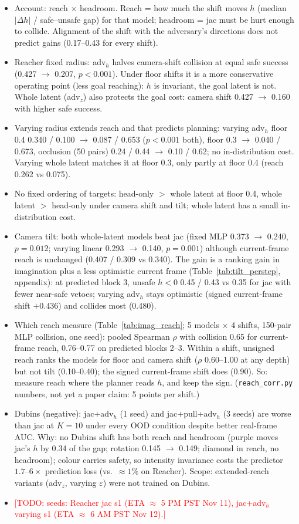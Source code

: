 \documentclass{article}
\newcommand{\todo}[1]{\textcolor{red}{[TODO: #1]}}
\begin{document}
\begin{itemize}
  \item Account: reach $\times$ headroom. Reach = how much the shift moves $h$ (median $|\Delta h|$ / safe--unsafe gap) for that model; headroom = jac must be hurt enough to collide. Alignment of the shift with the adversary's directions does not predict gains (0.17--0.43 for every shift).
  \item Reacher fixed radius: adv$_h$ halves camera-shift collision at equal safe success (0.427 $\to$ 0.207, $p<0.001$). Under floor shifts it is a more conservative operating point (less goal reaching): $h$ is invariant, the goal latent is not. Whole latent (adv$_z$) also protects the goal cost: camera shift 0.427 $\to$ 0.160 with higher safe success.
  \item Varying radius extends reach and that predicts planning: varying adv$_h$ floor 0.4 0.340 / 0.100 $\to$ 0.087 / 0.653 ($p<0.001$ both), floor 0.3 $\to$ 0.040 / 0.673, occlusion (50 pairs) 0.24 / 0.44 $\to$ 0.10 / 0.62; no in-distribution cost. Varying whole latent matches it at floor 0.3, only partly at floor 0.4 (reach 0.262 vs 0.075).
  \item No fixed ordering of targets: head-only $>$ whole latent at floor 0.4, whole latent $>$ head-only under camera shift and tilt; whole latent has a small in-distribution cost.
  \item Camera tilt: both whole-latent models beat jac (fixed MLP 0.373 $\to$ 0.240, $p=0.012$; varying linear 0.293 $\to$ 0.140, $p=0.001$) although current-frame reach is unchanged (0.407 / 0.309 vs 0.340). The gain is a ranking gain in imagination plus a less optimistic current frame (Table~\ref{tab:tilt_perstep}, appendix): at predicted block 3, unsafe $h<0$ 0.45 / 0.43 vs 0.35 for jac with fewer near-safe vetoes; varying adv$_h$ stays optimistic (signed current-frame shift $+0.436$) and collides most (0.480).
  \item Which reach measure (Table~\ref{tab:imag_reach}; 5 models $\times$ 4 shifts, 150-pair MLP collision, one seed): pooled Spearman $\rho$ with collision 0.65 for current-frame reach, 0.76--0.77 on predicted blocks 2--3. Within a shift, unsigned reach ranks the models for floor and camera shift ($\rho$ 0.60--1.00 at any depth) but not tilt (0.10--0.40); the signed current-frame shift does (0.90). So: measure reach where the planner reads $h$, and keep the sign. (\texttt{reach\_corr.py} numbers, not yet a paper claim: 5 points per shift.)
  \item Dubins (negative): jac+adv$_h$ (1 seed) and jac+pull+adv$_h$ (3 seeds) are worse than jac at $K=10$ under every OOD condition despite better real-frame AUC. Why: no Dubins shift has both reach and headroom (purple moves jac's $h$ by 0.34 of the gap; rotation 0.145 $\to$ 0.149; diamond in reach, no headroom); colour carries safety, so intensity invariance costs the predictor $1.7$--$6\times$ prediction loss (vs.\ $\approx 1\%$ on Reacher). Scope: extended-reach variants (adv$_z$, varying $\varepsilon$) were not trained on Dubins.
  \item \todo{seeds: Reacher jac s1 (ETA $\approx$ 5 PM PST Nov 11), jac+adv$_h$ varying s1 (ETA $\approx$ 6 AM PST Nov 12).}
\end{itemize}
\end{document}
